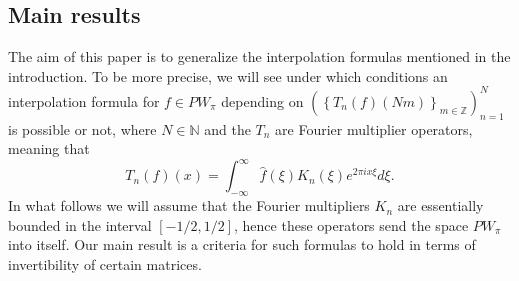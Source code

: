 \documentclass[reqno]{amsart}
\theoremstyle{plain}
\theoremstyle{definition}
\numberwithin{equation}{section}
\newcommand{\Z}{{\mathbb Z}}
\newcommand{\N}{{\mathbb N}}
\newcommand{\pa}[1]{\left(#1\right)}
\newcommand{\suc}[1]{\left\{#1\right\}}
\begin{document}
\subsection{Main results}

The aim of this paper is to generalize the interpolation formulas mentioned in the introduction. To 
be more precise, we will see under which conditions an interpolation formula for $f\in PW_\pi$ depending on 
$\pa{\suc{T_n(f)(Nm)}_{m\in\Z}}_{n=1}^N$ is possible or not, 
where $N\in\N$ and the $T_n$ are Fourier multiplier operators, meaning that
$$T_n(f)(x)=\int_{-\infty}^\infty \widehat{f}(\xi) K_n(\xi) e^{2\pi i x \xi} d\xi.$$
In what follows we will assume that the Fourier multipliers $K_n$ are essentially bounded in the interval $[-1/2,1/2]$, hence these operators send the space $PW_{\pi}$ into itself. Our main result is a criteria for such formulas to hold in terms of invertibility of certain matrices.   

\end{document}

